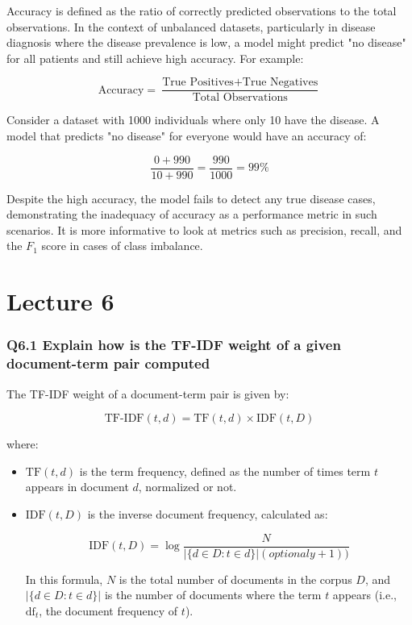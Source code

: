\documentclass[11pt]{article}
\begin{document}
Accuracy is defined as the ratio of correctly predicted observations to the total observations. In the context of unbalanced datasets, particularly in disease diagnosis where the disease prevalence is low, a model might predict "no disease" for all patients and still achieve high accuracy. For example:

\[
\text{Accuracy} = \frac{\text{True Positives} + \text{True Negatives}}{\text{Total Observations}}
\]

Consider a dataset with 1000 individuals where only 10 have the disease. A model that predicts "no disease" for everyone would have an accuracy of:

\[
\frac{0 + 990}{10 + 990} = \frac{990}{1000} = 99\%
\]

Despite the high accuracy, the model fails to detect any true disease cases, demonstrating the inadequacy of accuracy as a performance metric in such scenarios. It is more informative to look at metrics such as precision, recall, and the \( F_1 \) score in cases of class imbalance.

\part{Lecture 6}

\section{
Q6.1 Explain how is the TF-IDF weight of a given document-term pair computed
}

The TF-IDF weight of a document-term pair is given by:

\[
\text{TF-IDF}(t,d) = \text{TF}(t,d) \times \text{IDF}(t,D)
\]

where:
\begin{itemize}
  \item \( \text{TF}(t,d) \) is the term frequency, defined as the number of times term \( t \) appears in document \( d \), normalized or not.
  \item \( \text{IDF}(t,D) \) is the inverse document frequency, calculated as:

  \[
  \text{IDF}(t,D) = \log \frac{N}{|\{d \in D : t \in d\}| (optionaly + 1))}
  \]

  In this formula, \( N \) is the total number of documents in the corpus \( D \), and \( |\{d \in D : t \in d\}| \) is the number of documents where the term \( t \) appears (i.e., \( \text{df}_t \), the document frequency of \( t \)).
\end{itemize}
\end{document}
